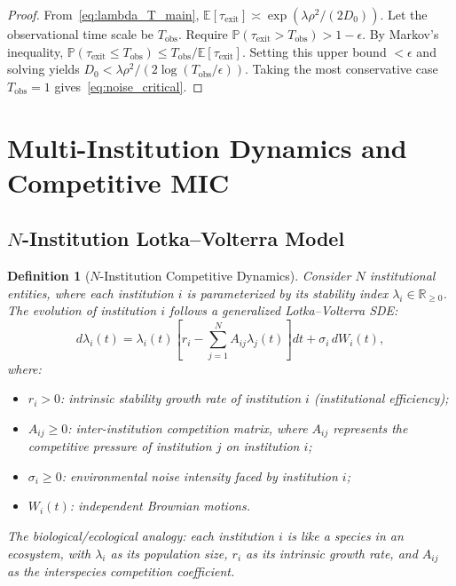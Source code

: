 \documentclass[12pt,a4paper]{article}
\newtheorem{definition}[theorem]{Definition}
\theoremstyle{definition}
\newcommand{\R}{\mathbb{R}}
\newcommand{\E}{\mathbb{E}}
\newcommand{\bracket}[1]{\left[#1\right]}
\newcommand{\lb}{\lambda}
\begin{document}
\begin{proof}
From~\eqref{eq:lambda_T_main}, $\E[\tau_{\text{exit}}] \asymp \exp(\lb \rho^2 / (2D_0))$. Let the observational time scale be $T_{\text{obs}}$. Require $\mathbb{P}(\tau_{\text{exit}} > T_{\text{obs}}) > 1 - \epsilon$. By Markov's inequality, $\mathbb{P}(\tau_{\text{exit}} \leq T_{\text{obs}}) \leq T_{\text{obs}} / \E[\tau_{\text{exit}}]$. Setting this upper bound $< \epsilon$ and solving yields $D_0 < \lb \rho^2 / (2\log(T_{\text{obs}}/\epsilon))$. Taking the most conservative case $T_{\text{obs}} = 1$ gives~\eqref{eq:noise_critical}.
\end{proof}

\section{Multi-Institution Dynamics and Competitive MIC}
\label{sec:multi}

\subsection{$N$-Institution Lotka--Volterra Model}
\label{sec:lotka_volterra}

\begin{definition}[$N$-Institution Competitive Dynamics]
\label{def:n_institution}
Consider $N$ institutional entities, where each institution $i$ is parameterized by its stability index $\lb_i \in \R_{\geq 0}$. The evolution of institution $i$ follows a generalized Lotka--Volterra SDE:
\begin{equation}\label{eq:lotka_volterra}
    d\lb_i(t) = \lb_i(t) \bracket{r_i - \sum_{j=1}^{N} A_{ij} \lb_j(t)} dt + \sigma_i \, dW_i(t),
\end{equation}
where:
\begin{itemize}
    \item $r_i > 0$: intrinsic stability growth rate of institution $i$ (institutional efficiency);
    \item $A_{ij} \geq 0$: inter-institution competition matrix, where $A_{ij}$ represents the competitive pressure of institution $j$ on institution $i$;
    \item $\sigma_i \geq 0$: environmental noise intensity faced by institution $i$;
    \item $W_i(t)$: independent Brownian motions.
\end{itemize}
The biological/ecological analogy: each institution $i$ is like a species in an ecosystem, with $\lb_i$ as its population size, $r_i$ as its intrinsic growth rate, and $A_{ij}$ as the interspecies competition coefficient.
\end{definition}
\end{document}
